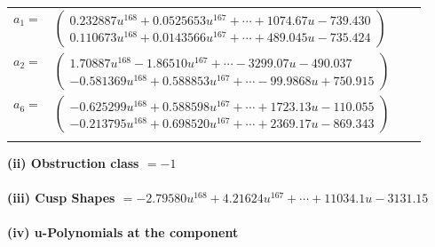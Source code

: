 \documentclass[1p]{elsarticle_modified}
\theoremstyle{definition}
\begin{document}
\begin{tabular}{m{7pt} m{180pt} m{7pt} m{180pt} }
\flushright $a_{1}=$&$\begin{pmatrix}0.232887 u^{168}+0.0525653 u^{167}+\cdots+1074.67 u-739.430\\0.110673 u^{168}+0.0143566 u^{167}+\cdots+489.045 u-735.424\end{pmatrix}$ \\
\flushright $a_{2}=$&$\begin{pmatrix}1.70887 u^{168}-1.86510 u^{167}+\cdots-3299.07 u-490.037\\-0.581369 u^{168}+0.588853 u^{167}+\cdots-99.9868 u+750.915\end{pmatrix}$ \\
\flushright $a_{6}=$&$\begin{pmatrix}-0.625299 u^{168}+0.588598 u^{167}+\cdots+1723.13 u-110.055\\-0.213795 u^{168}+0.698520 u^{167}+\cdots+2369.17 u-869.343\end{pmatrix}$\\&\end{tabular}
\flushleft \textbf{(ii) Obstruction class $= -1$}\\~\\
\flushleft \textbf{(iii) Cusp Shapes $= -2.79580 u^{168}+4.21624 u^{167}+\cdots+11034.1 u-3131.15$}\\~\\
\newpage\renewcommand{\arraystretch}{1}
\flushleft \textbf{(iv) u-Polynomials at the component}\newline \\
\end{document}
